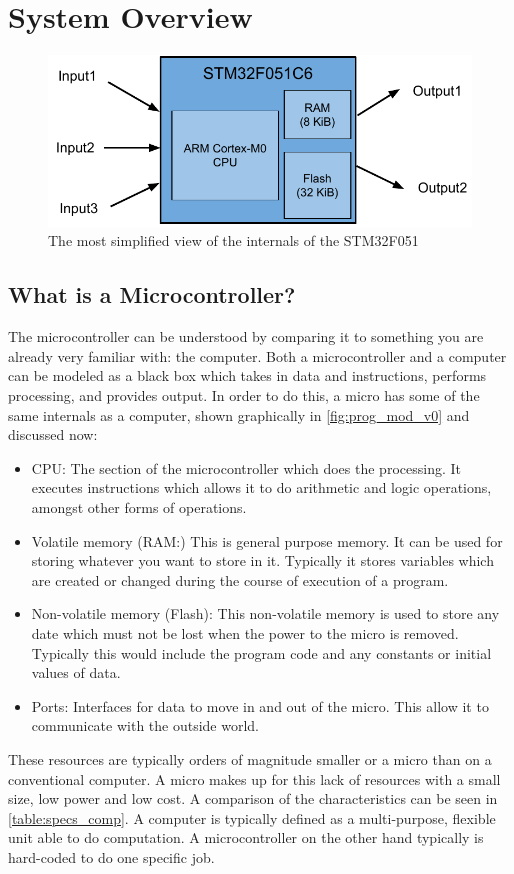 \chapter{System Overview}

\begin{figure}[t]
  \centering
  \includegraphics[width=\textwidth]{./fig/programmers_model_v0.pdf}
  \caption{The most simplified view of the internals of the STM32F051}
  \label{fig:prog_mod_v0}
\end{figure}

\section{What is a Microcontroller?}
The microcontroller can be understood by comparing it to something you are already very familiar with: the computer. Both a microcontroller and a computer can be modeled as a black box which takes in data and instructions, performs processing, and provides output.
In order to do this, a micro has some of the same internals as a computer, shown graphically in \autoref{fig:prog_mod_v0} and discussed now:
\begin{itemize}
  \item CPU: The section of the microcontroller which does the processing. It executes instructions which allows it to do arithmetic and logic operations, amongst other forms of operations.
  \item  Volatile memory (RAM:) This is general purpose memory. It can be used for storing whatever you want to store in it. Typically it stores variables which are created or changed during the course of execution of a program.
  \item Non-volatile memory (Flash): This non-volatile memory is used to store any date which must not be lost when the power to the micro is removed. Typically this would include the program code and any constants or initial values of data.
  \item Ports: Interfaces for data to move in and out of the micro. This allow it to communicate with the outside world. 
\end{itemize} 
These resources are typically orders of magnitude smaller or a micro than on a conventional computer. A micro makes up for this lack of resources with a small size, low power and low cost. A comparison of the characteristics can be seen in \autoref{table:specs_comp}.
A computer is typically defined as a multi-purpose, flexible unit able to do computation. A microcontroller on the other hand typically is hard-coded to do one specific job.\\

